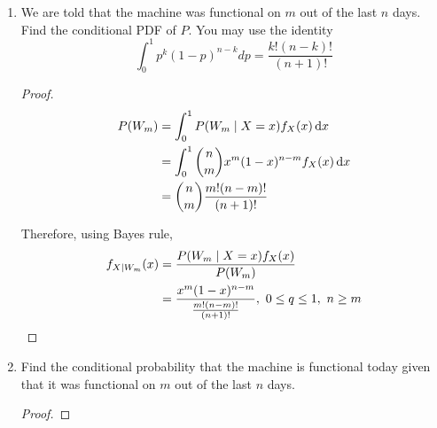 \documentclass[paper=usletter, fontsize=12pt]{article}
\begin{document}
\begin{enumerate}
\begin{enumerate}
\begin{proof}
                Let $W$ represent the event that the machine is functional\\
                Then,
                \begin{align*}
                    P(W) & = \int_{0}^{1}P(W \mid X=x)f_X(x)\diff{x}\\
                    & = \int_{0}^{1}x\diff{x}\\
                    & = \frac{1}{2} \qedhere
                \end{align*}
                \endgroup

            \end{proof}

            \item We are told that the machine was functional on $m$ out of the
            last $n$ days. Find the conditional PDF of $P$. You may use the
            identity
            \begin{equation*}
                \int_{0}^{1}p^k(1-p)^{n-k}dp=\frac{k!(n-k)!}{(n+1)!}
            \end{equation*}
            \begin{proof}

                \begin{align*}
                    P(W_m) & = \int_{0}^{1}P(W_m \mid X=x)f_X(x)\mathop{}\!\mathrm{d}{x}\\
                    & = \int_{0}^{1}\binom{n}{m}x^m(1-x)^{n-m}f_X(x)\mathop{}\!\mathrm{d}{x}\\
                    & = \binom{n}{m}\frac{m!(n-m)!}{(n+1)!}
                \end{align*}
                \endgroup

                Therefore, using Bayes rule,
                \begin{align*}
                    f_{X \mid W_m}(x) & = \frac{P(W_m \mid X = x)f_X(x)}{P(W_m)} \\
                    & = \frac{x^m(1-x)^{n-m}}{\frac{m!(n-m)!}{(n+1)!}}, \ 0 \le q \le 1, \ n \ge m \qedhere
                \end{align*}
                \endgroup

            \end{proof}

            \item Find the conditional probability that the machine is
            functional today given that it was functional on $m$ out of the
            last $n$ days.
            \begin{proof}


\end{proof}
\end{enumerate}
\end{enumerate}
\end{document}
